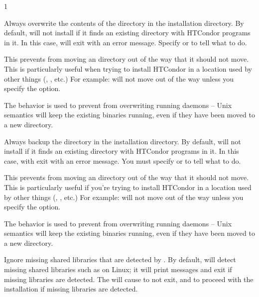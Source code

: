 \begin{ManPage}{\label{man-condor-configure}}{1}
\begin{Options}
   {
    Always overwrite the contents of the  directory in
    the installation directory.  By default, 
    will not install if it finds an existing  directory
    with HTCondor programs in it.  In this case, 
    will exit with an error message.  Specify
     or  to tell 
    what to do.

    This prevents  from moving an 
    directory out of the way that it should not move.  This is
    particularly useful when trying to install HTCondor in a
    location used by other things (, , etc.)
    For example:  
         will not move
     out of the way unless you specify the
     option.

    The  behavior is used to
    prevent  from overwriting running daemons --
    Unix semantics will keep the existing binaries running, even
    if they have been moved to a new directory.}

   {
    Always backup the  directory in the installation
    directory.  By default,  will not install if
    it finds an existing  directory with HTCondor programs
    in it.  In this case,  with exit with an
    error message.  You must specify  or
     to tell  what to do.

    This prevents  from moving an 
    directory out of the way that it should not move.  This is
    particularly useful if you're trying to install HTCondor in a
    location used by other things (, , etc.)
    For example:  
         will not move
     out of the way unless you specify the
     option.

    The  behavior is used to
    prevent  from overwriting running daemons --
    Unix semantics will keep the existing binaries running, even
    if they have been moved to a new directory.}

   {
    Ignore missing shared libraries that are detected by
    .  By default,  will detect
    missing shared libraries such as  on
    Linux; it will print messages and exit if missing libraries
    are detected.  The  will cause
     to not exit, and to proceed with the
    installation if missing libraries are detected.  }


\end{Options}
\end{ManPage}
